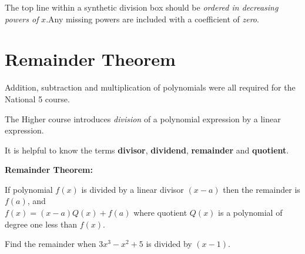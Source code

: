 \documentclass[
  11pt,
  openany]{book}
\begin{document}
The top line within a synthetic division box should be \textit{ordered in decreasing powers of }\(x\).\newline Any missing powers are included with a coefficient of \textit{zero}.

\pagebreak

\section{Remainder Theorem}\label{remainder-theorem}

\vspace{-0.5cm}

Addition, subtraction and multiplication of polynomials were all required for the National 5 course.

The Higher course introduces \emph{division} of a polynomial expression by a linear expression.

It is helpful to know the terms \textbf{divisor}, \textbf{dividend}, \textbf{remainder} and \textbf{quotient}.

\begin{center}
\end{center}

\begin{center}
\begin{tcolorbox}[colback=red!5,width=18cm,colframe=red!70!black]
\textbf{Remainder Theorem:}\\
    \begin{center}
        If polynomial $f(x)$ is divided by a linear divisor $(x-a)$ then the remainder is $f(a)$, and\\[0.4em] $f(x)=(x-a)Q(x)+f(a)$ where quotient $Q(x)$ is a polynomial of degree one less than $f(x)$.
    \end{center}
\end{tcolorbox}
\end{center}

\begin{tcolorbox}[title=Example,colback=PineGreen!2, colframe=PineGreen]

Find the remainder when $3x^3-x^2+5$ is divided by $(x-1)$.

\tcblower

\vspace{3cm}

\end{tcolorbox}
\end{document}
